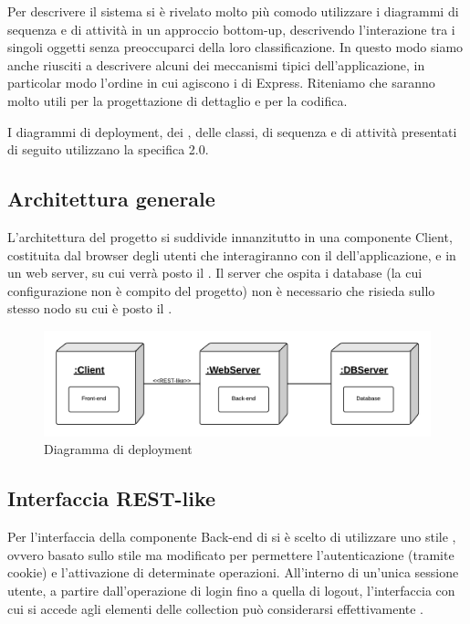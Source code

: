 Per descrivere il sistema si è rivelato molto più comodo utilizzare i diagrammi di sequenza e di attività in un approccio bottom-up, descrivendo l'interazione tra i singoli oggetti senza preoccuparci della loro classificazione. In questo modo siamo anche riusciti a descrivere alcuni dei meccanismi tipici dell'applicazione, in particolar modo l'ordine in cui agiscono i  di Express. Riteniamo che saranno molto utili per la progettazione di dettaglio e per la codifica.

I diagrammi di deployment, dei , delle classi, di sequenza e di attività presentati di seguito utilizzano la specifica  2.0.

\subsection{Architettura generale}

L'architettura del progetto si suddivide innanzitutto in una componente Client, costituita dal browser degli utenti che interagiranno con il  dell'applicazione, e in un web server, su cui verrà posto il . Il server che ospita i database (la cui configurazione non è compito del progetto) non è necessario che risieda sullo stesso nodo su cui è posto il .

\begin{figure}[H]
\centering
\includegraphics[width=\textwidth]{uml/diagramma-deployment.png}
\caption{Diagramma di deployment}
\end{figure}

\subsection{Interfaccia REST-like}
Per l'interfaccia della componente Back-end di \ProjectName{} si è scelto di utilizzare uno stile , ovvero basato sullo stile  ma modificato per permettere l'autenticazione (tramite cookie) e l'attivazione di determinate operazioni. All'interno di un'unica sessione utente, a partire dall'operazione di login fino a quella di logout, l'interfaccia con cui si accede agli elementi delle collection può considerarsi effettivamente .


